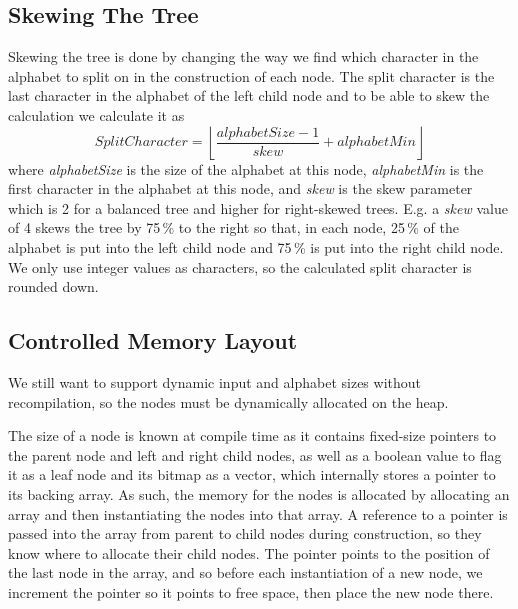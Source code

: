 \subsection{Skewing The Tree}
\label{sec:SkewingTheTree}
Skewing the tree is done by changing the way we find which character in the alphabet to split on in the construction of each node.
The split character is the last character in the alphabet of the left child node and to be able to skew the calculation we calculate it as
\[\mathit{SplitCharacter} = \left\lfloor \frac{\mathit{alphabetSize}-1}{\mathit{skew}} + \mathit{alphabetMin} \right\rfloor \]
where \textit{alphabetSize} is the size of the alphabet at this node, \textit{alphabetMin} is the first character in the alphabet at this node, and \textit{skew} is the skew parameter which is 2 for a balanced tree and higher for right-skewed trees. E.g. a \textit{skew} value of 4 skews the tree by 75\,\% to the right so that, in each node, 25\,\% of the alphabet is put into the left child node and 75\,\% is put into the right child node.
We only use integer values as characters, so the calculated split character is rounded down.


\subsection{Controlled Memory Layout}
We still want to support dynamic input and alphabet sizes without recompilation, so the nodes must be dynamically allocated on the heap.

The size of a node is known at compile time as it contains fixed-size pointers to the parent node and left and right child nodes, as well as a boolean value to flag it as a leaf node and its bitmap as a vector, which internally stores a pointer to its backing array.
As such, the memory for the nodes is allocated by allocating an array and then instantiating the nodes into that array.
A reference to a pointer is passed into the array from parent to child nodes during construction, so they know where to allocate their child nodes.
The pointer points to the position of the last node in the array, and so before each instantiation of a new node, we increment the pointer so it points to free space, then place the new node there.

